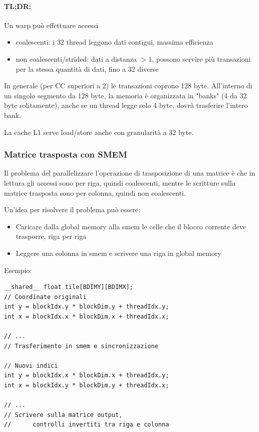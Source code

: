 \paragraph{TL;DR:} Un warp può effettuare accessi
\begin{itemize}
	\item coalescenti: i 32 thread leggono dati contigui, massima efficienza
	\item non coalescenti/strided: dati a distanza $>1$, possono servire più transazioni per la stessa quantità di dati, fino a 32 diverse
\end{itemize}

In generale (per CC superiori a 2) le transazioni coprono 128 byte. All'interno di un singolo segmento da 128 byte, la memoria è organizzata in "banks" (4 da 32 byte solitamente), anche se un thread legge solo 4 byte, dovrà trasferire l'intero bank.

La cache L1 serve load/store anche con granularità a 32 byte.

\subsubsection{Matrice trasposta con SMEM}

Il problema del parallelizzare l'operazione di trasposizione di una matrice  è che in lettura gli accessi sono per riga, quindi coalescenti, mentre le scritture sulla matrice trasposta sono per colonna, quindi non coalescenti.

Un'idea per risolvere il problema può essere: 
\begin{itemize}
	\item Caricare dalla global memory alla smem le celle che il blocco corrente deve trasporre, riga per riga
	
	\item Leggere una colonna in smem e scrivere una riga in global memory
\end{itemize}

Esempio:
\begin{verbatim}
__shared__ float tile[BDIMY][BDIMX];
// Coordinate originali
int y = blockIdx.y * blockDim.y + threadIdx.y;
int x = blockIdx.x * blockDim.x + threadIdx.x;

// ...
// Trasferimento in smem e sincronizzazione

// Nuovi indici
int y = blockIdx.x * blockDim.x + threadIdx.y;
int x = blockIdx.y * blockDim.y + threadIdx.x;

// ...
// Scrivere sulla matrice output, 
//		controlli invertiti tra riga e colonna
\end{verbatim}